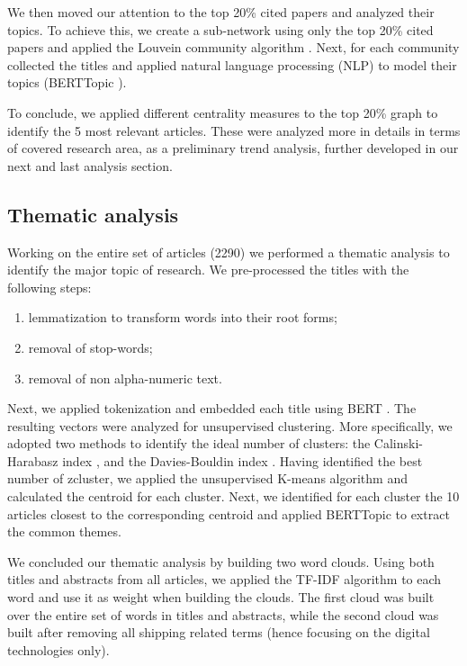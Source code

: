 \documentclass[a4paper, review, endfloat, authoryear]{elsarticle}
\begin{document}
	We then moved our attention to the top 20\% cited papers and analyzed their topics. To achieve this, we create a sub-network using only the top 20\% cited papers and applied the Louvein community algorithm \citep{blondel2008fast}. Next, for each community collected the titles and applied natural language processing (NLP) to model their topics (BERTTopic \citep{paulcombining}).
	
	To conclude, we applied different centrality measures to the top 20\% graph to identify the 5 most relevant articles. These were analyzed more in details in terms of covered research area, as a preliminary trend analysis, further developed in our next and last analysis section.
	
	\subsection{Thematic analysis}
	Working on the entire set of articles (2290) we performed a thematic analysis to identify the major topic of research. We pre-processed the titles with the following steps:
	\begin{enumerate}
		\item lemmatization to transform words into their root forms;
		\item removal of stop-words;
		\item removal of non alpha-numeric text.
	\end{enumerate}
	Next, we applied tokenization and embedded each title using BERT \citep{devlin2018bert}. The resulting vectors were analyzed for unsupervised clustering. More specifically, we adopted two methods to identify the ideal number of clusters: the Calinski-Harabasz index \citep{calinski1974dendrite}, and the Davies-Bouldin index \citep{davies1979cluster}.
	Having identified the best number of zcluster, we applied the unsupervised K-means algorithm and calculated the centroid for each cluster.
	Next, we identified for each cluster the 10 articles closest to the corresponding centroid and applied BERTTopic to extract the common themes.
	
	We concluded our thematic analysis by building two word clouds. Using both titles and abstracts from all articles, we applied the TF-IDF algorithm to each word and use it as weight when building the clouds. The first cloud was built over the entire set of words in titles and abstracts, while the second cloud was built after removing all shipping related terms (hence focusing on the digital technologies only).
	
\end{document}
